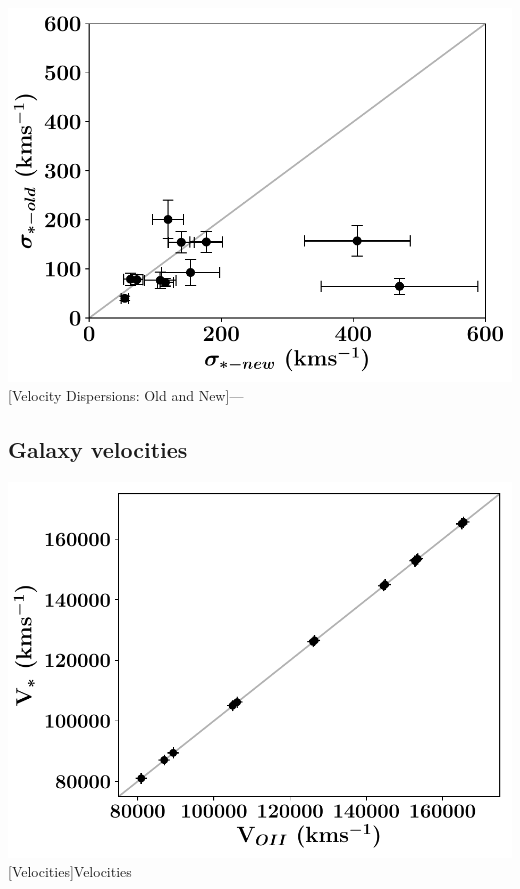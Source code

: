 \documentclass[12pt, twocolumn]{revtex4}    %
\begin{document}

\begin{center}
\includegraphics[width=1.0\linewidth]{data/sigma_stars_old_vs_new}
[Velocity Dispersions: Old and New]{---}
\label{fig:velocity_dispersions_old_new}
\end{center}

\subsection{Galaxy velocities}


\begin{center}
\includegraphics[width=1.0\linewidth]{data/vel_star_vs_vel_oii}
[Velocities]{Velocities}
\label{fig:velocities}
\end{center}
\end{document}
